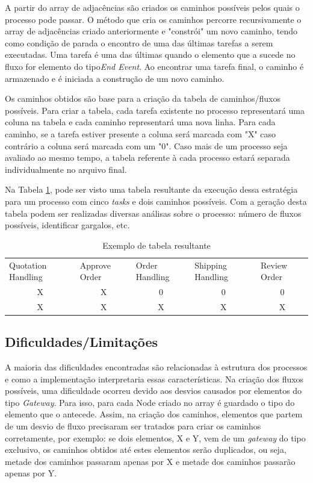 \documentclass[12pt]{article}
\begin{document}
A partir do array de adjacências são criados os caminhos possíveis pelos quais o processo pode passar. O método que cria os caminhos percorre recursivamente o array de adjacências criado anteriormente e "constrói" um novo caminho, tendo como condição de parada o encontro de uma das últimas tarefas a serem executadas. Uma tarefa é uma das últimas quando o elemento que a sucede no fluxo for elemento do tipo\emph{End Event}. Ao encontrar uma tarefa final, o caminho é armazenado e é iniciada a construção de um novo caminho.

Os caminhos obtidos são base para a criação da tabela de caminhos/fluxos possíveis. Para criar a tabela, cada tarefa existente no processo representará uma coluna na tabela e cada caminho representará uma nova linha. Para cada caminho, se a tarefa estiver presente a coluna será marcada com "X" caso contrário a coluna será marcada com um "0". Caso mais de um processo seja avaliado ao mesmo tempo, a tabela referente à cada processo estará separada individualmente no arquivo final. 

Na Tabela \ref{tab:exemplo}, pode ser visto uma tabela resultante da execução dessa estratégia para um processo com cinco \emph{tasks} e dois caminhos possíveis. Com a geração desta tabela podem ser realizadas diversas análisas sobre o processo: número de fluxos possíveis, identificar gargalos, etc.

\begin{table}[]
\centering
\caption{Exemplo de tabela resultante}
\label{tab:exemplo}
\begin{tabular}{ccccc}
\multicolumn{1}{l}{Quotation Handling} & \multicolumn{1}{l}{Approve Order} & \multicolumn{1}{l}{Order Handling} & \multicolumn{1}{l}{Shipping Handling} & \multicolumn{1}{l}{Review Order} \\
X & X & 0 & 0 & 0 \\
X & X & X & X & X
\end{tabular}
\end{table}

\subsection{Dificuldades/Limitações}
A maioria das dificuldades encontradas são relacionadas à estrutura dos processos e como a implementação interpretaria essas características. Na criação dos fluxos possíveis, uma dificuldade ocorreu devido aos desvios causados por elementos do tipo \emph{Gateway}. Para isso, para cada Node criado no array é guardado o tipo do elemento que o antecede. Assim, na criação dos caminhos, elementos que partem de um desvio de fluxo precisaram ser tratados para criar os caminhos corretamente, por exemplo: se dois elementos, X e Y, vem de um \emph{gateway} do tipo  exclusivo, os caminhos obtidos até estes elementos serão duplicados, ou seja, metade dos caminhos passaram apenas por X e metade dos caminhos passarão apenas por Y.
\end{document}
